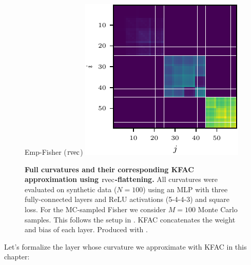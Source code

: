 \begin{figure}[!h]
\begin{minipage}[t]{0.485\linewidth}
  \end{minipage}
  \hfill
  \begin{minipage}[t]{0.485\linewidth}
    \centering
    Emp-Fisher ($\operatorname{rvec}$)\vspace{1ex}
    \includegraphics[width=\linewidth]{../kfs/plots/synthetic_rvec_empfisher_kfac.pdf}
  \end{minipage}
  \caption{\textbf{Full curvatures and their corresponding KFAC approximation using $\operatorname{rvec}$-flattening.}
    All curvatures were evaluated on synthetic data ($N = 100$) using an MLP with three fully-connected layers and ReLU activations (5-4-4-3) and square loss.
    For the MC-sampled Fisher we consider $M = 100$ Monte Carlo samples.
    This follows the setup in .
    KFAC concatenates the weight and bias of each layer.
    Produced with .}
  \label{fig:rvec-kfac-full-comparison}
\end{figure}

\switchcolumn[0]

Let's formalize the layer whose curvature we approximate with KFAC in this chapter:

